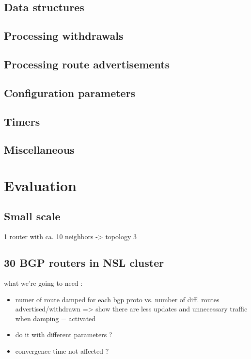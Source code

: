 \documentclass[a4paper,english]{IEEEtran}
\begin{document}
\subsection{Data structures}


\subsection{Processing withdrawals}


\subsection{Processing route advertisements}


\subsection{Configuration parameters}


\subsection{Timers}


\subsection{Miscellaneous}


\section{Evaluation}


\subsection{Small scale}

1 router with ca. 10 neighbors -> topology 3


\subsection{30 BGP routers in NSL cluster}

what we're going to need :
\begin{itemize}
\item numer of route damped for each bgp proto vs. number of diff. routes
advertised/withdrawn => show there are less updates and unnecessary
traffic when damping = activated
\item do it with different parameters ?
\item convergence time not affected ?
\end{itemize}
\end{document}
